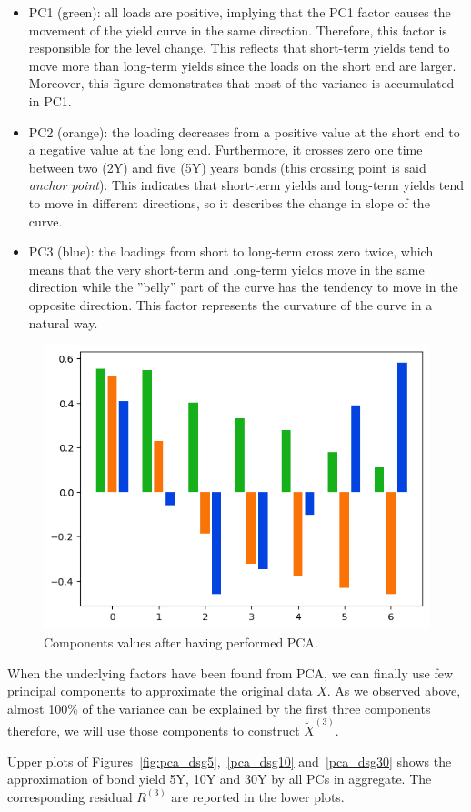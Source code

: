 \begin{itemize}
\item PC1 (green): all loads are positive, implying that the PC1 factor causes the movement of the yield curve in the same direction. Therefore, this factor is responsible for the level change. This reflects that short-term yields tend to move more than long-term yields since the loads on the short end are larger. Moreover, this figure demonstrates that most of the variance is accumulated in PC1.
\item PC2 (orange): the loading decreases from a positive value at the short end to a negative value at the long end. Furthermore, it crosses zero one time between two (2Y) and five (5Y) years bonds (this crossing point is said \emph{anchor point}). This indicates that short-term yields and long-term yields tend to move in different directions, so it describes the change in slope of the curve.
\item PC3 (blue): the loadings from short to long-term cross zero twice, which means that the very short-term and long-term yields move in the same direction while the ”belly” part of the curve has the tendency to move in the opposite direction. This factor represents the curvature of the curve in a natural way.
\end{itemize}
	
\begin{figure}[hbtp]
	\centering
	\includegraphics[width=0.5\linewidth]{figures/pca_loading_matrix}
	\caption{Components values after having performed PCA.}
	\label{fig:yield_pca_components}
\end{figure}

When the underlying factors have been found from PCA, we can finally use few principal components to approximate the original data $X$. As we observed above, almost 100\% of the variance can be explained by the first three components therefore, we will use those components to construct $\tilde{X}^{(3)}$.

Upper plots of Figures~\ref{fig:pca_dsg5},~\ref{pca_dsg10} and~\ref{pca_dsg30} shows the approximation of bond yield 5Y, 10Y and 30Y by all PCs in aggregate.
The corresponding residual $R^{(3)}$ are reported in the lower plots.

